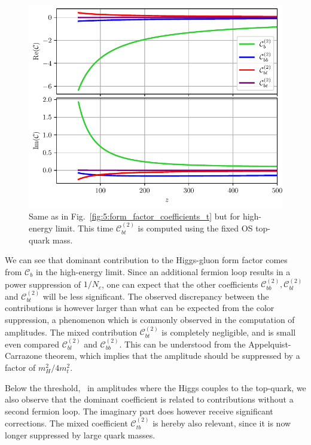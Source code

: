 \begin{figure}[h]
\centering
\includegraphics[width=\figurewidth]{Images/form_factor_coefficients_b.pdf}
\caption{Same as in Fig.~\ref{fig:5:form_factor_coefficients_t} but for high-energy limit. This time $\mathcal{C}_{bt}^{(2)}$ is computed using the fixed \acs{OS} top-quark mass.}
\label{fig:5:form_factor_coefficients_b}
\end{figure}
We can see that dominant contribution to the Higgs-gluon form factor comes from $\mathcal{C}_{b}$ in the high-energy limit. Since an additional fermion loop results in a power suppression of $1/N_c$, one can expect that the other coefficients $\mathcal{C}_{bb}^{(2)}, \mathcal{C}_{bl}^{(2)}$ and $\mathcal{C}_{bt}^{(2)}$ will be less significant. The observed discrepancy between the contributions is however larger than what can be expected from the color suppression, a phenomenon which is commonly observed in the computation of amplitudes. The mixed contribution $\mathcal{C}_{bt}^{(2)}$ is completely negligible, and is small even compared $\mathcal{C}_{bl}^{(2)}$ and $\mathcal{C}_{bb}^{(2)}$. This can be understood from the Appelquist-Carrazone theorem, which implies that the amplitude should be suppressed by a factor of $m_H^2/4m_t^2$.

Below the threshold, \ie\ in amplitudes where the Higgs couples to the top-quark, we also observe that the dominant coefficient is related to contributions without a second fermion loop. The imaginary part does however receive significant corrections. The mixed coefficient $\mathcal{C}_{tb}^{(2)}$ is hereby also relevant, since it is now longer suppressed by large quark masses.

